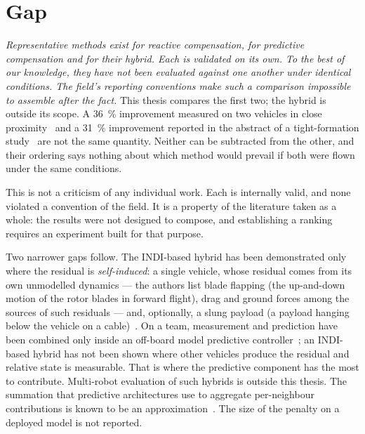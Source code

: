 \section{Gap}
\label{sec:intro-gap}

\emph{Representative methods exist for reactive compensation, for predictive compensation and for
their hybrid. Each is validated on its own. To the best of our knowledge, they have not been
evaluated against one another under identical conditions. The field's reporting conventions make
such a comparison impossible to assemble after the fact.} This thesis compares the first two;
the hybrid is outside its scope. A \SI{36}{\percent} improvement measured on two vehicles in close
proximity~\cite{smith2023so2equivariant} and a \SI{31}{\percent} improvement reported in the
abstract of a tight-formation study~\cite{hsieh2026flatness} are not the same quantity. Neither can
be subtracted from the other, and their ordering says nothing about which method would prevail if
both were flown under the same conditions.

This is not a criticism of any individual work. Each is internally valid, and none violated a
convention of the field. It is a property of the literature taken as a whole: the results were not
designed to compose, and establishing a ranking requires an experiment built for that purpose.

Two narrower gaps follow. The INDI-based hybrid has been demonstrated only where the residual is
\emph{self-induced}: a single vehicle, whose residual comes from its own unmodelled dynamics --- the
authors list blade flapping (the up-and-down motion of the rotor blades in forward flight), drag and
ground forces among the sources of such residuals --- and, optionally, a
slung payload (a payload hanging below the vehicle on a cable)~\cite{cobobriesewitz2026lindi}. On a
team, measurement and prediction have been combined only inside an off-board model predictive
controller~\cite{hsieh2025onlineadaptation}; an INDI-based hybrid has not been shown where other
vehicles produce the residual and relative state
is measurable. That is where the predictive component has the most to contribute. Multi-robot
evaluation of such hybrids is outside this thesis. The summation that predictive architectures use
to aggregate per-neighbour contributions is known to be an
approximation~\cite{shi2020neuralswarm,gielis2023aggregate}. The size of the penalty on a deployed
model is not reported.

